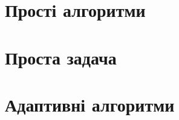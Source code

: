 \documentclass[a4paper,14pt,openany,oneside,oldfontcommands]{memoir}
\begin{document}
 
\newpage
\tableofcontents
\newpage

\setcounter{page}{3}


\newpage

\chapter{Прості алгоритми}

\newpage

\newpage

\chapter{Проста задача}

\newpage

\newpage


\newpage

\newpage

\chapter{Адаптивні алгоритми}

\newpage

\newpage

\newpage


\newpage

\newpage
\end{document}
